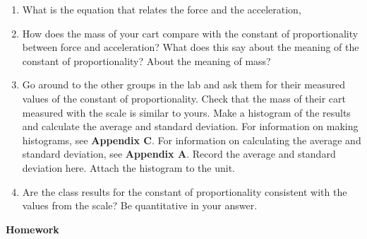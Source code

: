 \begin{enumerate}
\vspace{15mm}

\item What is the equation that relates the force and the acceleration, 

\vspace{15mm}

\item How does the mass of your cart compare with the constant of 
proportionality between force and acceleration?
What does this say about the meaning of the constant of proportionality? About the meaning of mass?

\vspace{15mm}

\item Go around to the other groups in the lab and ask them for their measured values of the
constant of proportionality.
Check that the mass of their cart measured with the scale is similar to yours.
Make a histogram of the results and calculate the average and standard deviation.
For information on making histograms, see \textbf{Appendix C}. For information on calculating the average and
standard deviation, see \textbf{Appendix A}. Record the average and standard deviation here.
Attach the histogram to the unit.

\vspace{15mm}

\item Are the class results for the constant of proportionality consistent with the values from the scale?
Be quantitative in your answer.

\vspace{15mm}

\end{enumerate}

\newpage 

\textbf{Homework} 

